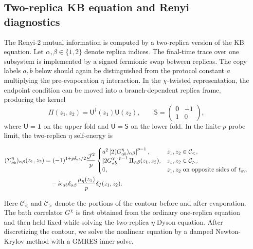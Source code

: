 \documentclass[pdflatex,sn-nature]{sn-jnl}
\begin{document}
\subsection{Two-replica KB equation and Renyi diagnostics}
\label{sec:methods-two-replica}

The Renyi-2 mutual information is computed by a two-replica version of the KB equation. Let \(\alpha,\beta\in\{1,2\}\) denote replica indices. The final-time trace over one subsystem is implemented by a signed fermionic swap between replicas. The copy labels \(a,b\) below should again be distinguished from the protocol constant \(a\) multiplying the pre-evaporation \(\eta\) interaction. In the \(\chi\)-twisted representation, the endpoint condition can be moved into a branch-dependent replica frame, producing the kernel
\begin{equation}
\Pi(z_1,z_2)=\mathsf U^\dagger(z_1)\mathsf U(z_2),
\qquad
\mathsf S=
\begin{pmatrix}
0&-1\\
1&0
\end{pmatrix},
\label{eq:methods-twist-kernel}
\end{equation}
where \(\mathsf U=\mathbf 1\) on the upper fold and \(\mathsf U=\mathsf S\) on the lower fold. In the finite-\(p\) probe limit, the two-replica \(\eta\) self-energy is

\begin{equation}
\begin{aligned}
(\Sigma^\eta_{ab})_{\alpha\beta}(z_1,z_2)
&=
(-1)^{1+p\delta_{ab}/2}
\frac{\mathcal J^2}{p}
\begin{cases}
a^2
\left[
2(G^\eta_{ab})_{\alpha\beta}
\right]^{p-1},
&z_1,z_2\in\mathcal C_<,
\\
\left[
2G^\chi_{ab}
\right]^{p-1}
\Pi_{\alpha\beta}(z_1,z_2),
&z_1,z_2\in\mathcal C_>,
\\
0,
&z_1,z_2\ {\rm on\ opposite\ sides\ of}\ t_{\rm ev},
\end{cases}
\\
&\quad
-i\epsilon_{ab}\delta_{\alpha\beta}
\frac{\mu_\eta(z_1)}{p}
\delta_{\mathcal C}(z_1,z_2).
\end{aligned}
\label{eq:methods-two-replica-self-energy}
\end{equation}

Here \(\mathcal C_<\) and \(\mathcal C_>\) denote the portions of the contour before and after evaporation. The bath correlator \(G^\chi\) is first obtained from the ordinary one-replica equation and then held fixed while solving the two-replica \(\eta\) Dyson equation. After discretizing the contour, we solve the nonlinear equation by a damped Newton-Krylov method with a GMRES inner solve.
\end{document}
